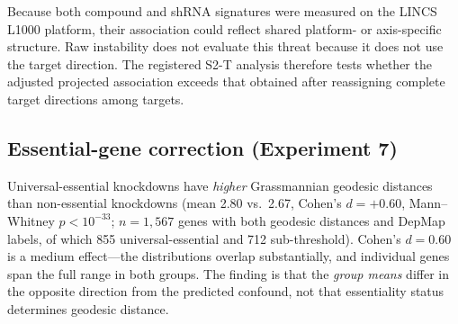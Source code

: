 \documentclass[11pt]{article}
\begin{document}
Because both compound and shRNA signatures were measured on the LINCS L1000
platform, their association could reflect shared platform- or axis-specific
structure. Raw instability does not evaluate this threat because it does not use
the target direction. The registered S2-T analysis therefore tests whether the
adjusted projected association exceeds that obtained after reassigning complete
target directions among targets.

%

\subsection{Essential-gene correction (Experiment 7)}

Universal-essential knockdowns have \emph{higher} Grassmannian geodesic
distances than non-essential knockdowns (mean 2.80 vs.\ 2.67, Cohen's $d =
+0.60$, Mann--Whitney $p < 10^{-33}$; $n = 1{,}567$ genes with both
geodesic distances and DepMap labels, of which 855 universal-essential and
712 sub-threshold). Cohen's $d = 0.60$ is a medium effect---the
distributions overlap substantially, and individual genes span the full
range in both groups. The finding is that the \emph{group means} differ
in the opposite direction from the predicted confound, not that essentiality
status determines geodesic distance.
\end{document}
